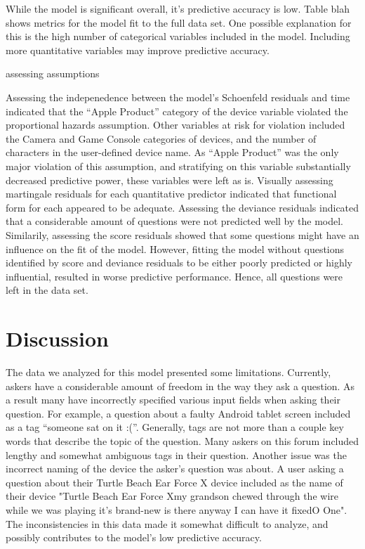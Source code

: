 \documentclass[12pt]{article}
\begin{document}
While the model is significant overall, it's predictive accuracy is low. Table blah shows metrics for the model fit to the full data set. One possible explanation for this is the high number of categorical variables included in the model. Including more quantitative variables may improve predictive accuracy. 

assessing assumptions 

Assessing the indepenedence between the model's Schoenfeld residuals and time indicated that the ``Apple Product'' category of the device variable violated the proportional hazards assumption. Other variables at risk for violation included the Camera and Game Console categories of devices, and the number of characters in the user-defined device name. As ``Apple Product'' was the only major violation of this assumption, and stratifying on this variable substantially decreased predictive power, these variables were left as is. 
Visually assessing martingale residuals for each quantitative predictor indicated that functional form for each appeared to be adequate. Assessing the deviance residuals indicated that a considerable amount of questions were not predicted well by the model. Similarily, assessing the score residuals showed that some questions might have an influence on the fit of the model. However, fitting the model without questions identified by score and deviance residuals to be either poorly predicted or highly influential, resulted in worse predictive performance. Hence, all questions were left in the data set.

\section{Discussion}

The data we analyzed for this model presented some limitations. Currently, askers have a considerable amount of freedom in the way they ask a question. As a result many have incorrectly specified various input fields when asking their question. For example, a question about a faulty Android tablet screen included as a tag ``someone sat on it :(''. Generally, tags are not more than a couple key words that describe the topic of the question. Many askers on this forum included lengthy and somewhat ambiguous tags in their question. Another issue was the incorrect naming of the device the asker's question was about. A user asking a question about their Turtle Beach Ear Force X device included as the name of their device "Turtle Beach Ear Force Xmy grandson chewed through the wire while we was playing it's brand-new is there anyway I can have it fixedO One". The inconsistencies in this data made it somewhat difficult to analyze, and possibly contributes to the model's low predictive accuracy. 
\end{document}
